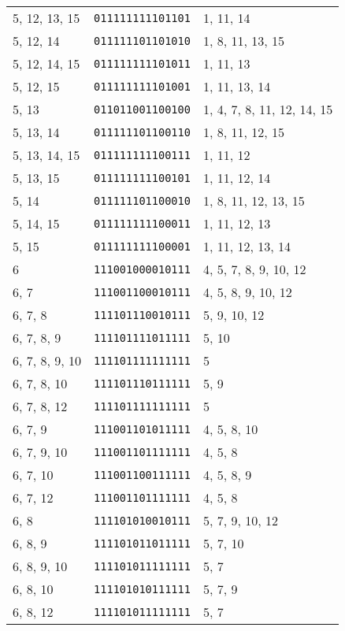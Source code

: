 \documentclass[a4paper,12pt]{article}
\begin{document}
\begin{longtable}{l|l|l}
        5, 12, 13, 15&\texttt{011111111101101}&1, 11, 14\\
        5, 12, 14&\texttt{011111101101010}&1, 8, 11, 13, 15\\
        5, 12, 14, 15&\texttt{011111111101011}&1, 11, 13\\
        5, 12, 15&\texttt{011111111101001}&1, 11, 13, 14\\
        5, 13&\texttt{011011001100100}&1, 4, 7, 8, 11, 12, 14, 15\\
        5, 13, 14&\texttt{011111101100110}&1, 8, 11, 12, 15\\
        5, 13, 14, 15&\texttt{011111111100111}&1, 11, 12\\
        5, 13, 15&\texttt{011111111100101}&1, 11, 12, 14\\
        5, 14&\texttt{011111101100010}&1, 8, 11, 12, 13, 15\\
        5, 14, 15&\texttt{011111111100011}&1, 11, 12, 13\\
        5, 15&\texttt{011111111100001}&1, 11, 12, 13, 14\\
        6&\texttt{111001000010111}&4, 5, 7, 8, 9, 10, 12\\
        6, 7&\texttt{111001100010111}&4, 5, 8, 9, 10, 12\\
        6, 7, 8&\texttt{111101110010111}&5, 9, 10, 12\\
        6, 7, 8, 9&\texttt{111101111011111}&5, 10\\
        6, 7, 8, 9, 10&\texttt{111101111111111}&5\\
        6, 7, 8, 10&\texttt{111101110111111}&5, 9\\
        6, 7, 8, 12&\texttt{111101111111111}&5\\
        6, 7, 9&\texttt{111001101011111}&4, 5, 8, 10\\
        6, 7, 9, 10&\texttt{111001101111111}&4, 5, 8\\
        6, 7, 10&\texttt{111001100111111}&4, 5, 8, 9\\
        6, 7, 12&\texttt{111001101111111}&4, 5, 8\\
        6, 8&\texttt{111101010010111}&5, 7, 9, 10, 12\\
        6, 8, 9&\texttt{111101011011111}&5, 7, 10\\
        6, 8, 9, 10&\texttt{111101011111111}&5, 7\\
        6, 8, 10&\texttt{111101010111111}&5, 7, 9\\
        6, 8, 12&\texttt{111101011111111}&5, 7\\

\end{longtable}
\end{document}

